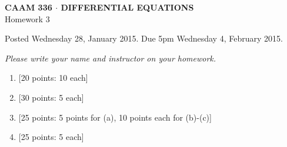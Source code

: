\documentclass[10pt]{article}
\begin{document}
\newcommand{\pd}[3]{\frac{\partial^{#3} #1}{\partial #2^{#3}}}

\vspace*{-5em}
\begin{center}
\large \textsf{\textbf{CAAM 336 $\cdot$ DIFFERENTIAL EQUATIONS}\\[0.5em]
Homework 3 }
\end{center}

Posted Wednesday 28, January 2015.  Due 5pm Wednesday 4, February 2015.

\begin{center}
\emph{Please write your name and instructor on your homework.}
\end{center}

\begin{enumerate}
\item {[20 points: 10 each]}  
\vspace{4em}
\item {[30 points: 5 each]}  
\newpage
\item {[25 points: 5 points for (a), 10 points each for (b)-(c)]}  
\vspace{4em}
\item {[25 points: 5 each]}  

\end{enumerate}
\end{document}
